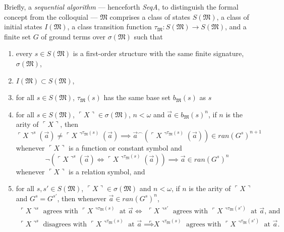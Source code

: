 \documentclass[12pt, twoside]{memoir}
\numberwithin{equation}{section}
\theoremstyle{definition}
\theoremstyle{remark}
\theoremstyle{definition}
\theoremstyle{definition}
\theoremstyle{definition}
\theoremstyle{remark}
\begin{document}
Briefly, a \emph{sequential algorithm} --- henceforth \textit{SeqA}, to distinguish the formal concept from the colloquial --- $\mathfrak{M}$ comprises a class of states $S(\mathfrak{M})$, a class of initial states $I(\mathfrak{M})$, a class transition function $\tau_{\mathfrak{M}} : S(\mathfrak{M}) \longrightarrow S(\mathfrak{M})$, and a finite set $G$ of ground terms over $\sigma(\mathfrak{M})$ such that
\begin{enumerate}[label=(A\arabic*)]
    \item\label{a1} every $s \in S(\mathfrak{M})$ is a first-order structure with the same finite signature, $\sigma(\mathfrak{M})$,
    \item\label{a2} $I(\mathfrak{M}) \subset S(\mathfrak{M})$,
    \item\label{a3'} for all $s \in S(\mathfrak{M})$, $\tau_{\mathfrak{M}}(s)$ has the same base set $b_{\mathfrak{M}}(s)$ as $s$
    \item\label{a3} for all $s \in S(\mathfrak{M})$, $\ulcorner X \urcorner \in \sigma(\mathfrak{M})$, $n < \omega$ and $\Vec{a} \in b_{\mathfrak{M}}(s)^n$, if $n$ is the arity of $\ulcorner X \urcorner$, then
    \begin{equation*}
        \ulcorner X \urcorner^s(\Vec{a}) \neq \ulcorner X \urcorner^{\tau_{\mathfrak{M}}(s)}(\Vec{a}) \implies \Vec{a}^\frown(\ulcorner X \urcorner^{\tau_{\mathfrak{M}}(s)}(\Vec{a})) \in ran(G^s)^{n+1}
    \end{equation*}
    whenever $\ulcorner X \urcorner$ is a function or constant symbol and
    \begin{equation*}
        \neg (\ulcorner X \urcorner^s(\Vec{a}) \iff \ulcorner X \urcorner^{\tau_{\mathfrak{M}}(s)}(\Vec{a})) \implies \Vec{a} \in ran(G^s)^n
    \end{equation*}
    whenever $\ulcorner X \urcorner$ is a relation symbol, and
    \item\label{a4} for all $s, s' \in S(\mathfrak{M})$, $\ulcorner X \urcorner \in \sigma(\mathfrak{M})$ and $n < \omega$, if $n$ is the arity of $\ulcorner X \urcorner$ and $G^s = G^{s'}$, then whenever $\Vec{a} \in ran(G^s)^n$,
    \begin{align*}
        \ulcorner X \urcorner^{s} \text{ agrees with } \ulcorner X \urcorner^{\tau_{\mathfrak{M}}(s)} \text{ at } \Vec{a} \iff \ & \ulcorner X \urcorner^{s'} \text{ agrees with } \ulcorner X \urcorner^{\tau_{\mathfrak{M}}(s')} \text{ at } \Vec{a} \text{, and} \\
        \ulcorner X \urcorner^{s} \text{ disagrees with } \ulcorner X \urcorner^{\tau_{\mathfrak{M}}(s)} \text{ at } \Vec{a} \implies \ & \ulcorner X \urcorner^{\tau_{\mathfrak{M}}(s)} \text{ agrees with } \ulcorner X \urcorner^{\tau_{\mathfrak{M}}(s')} \text{ at } \Vec{a} \text{.}
    \end{align*}
\end{enumerate}
\end{document}
